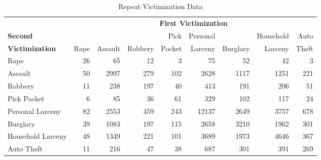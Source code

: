 \begin{table}[htb]
 \caption{Repeat Victimization Data}
 \label{tab:victims}
 \begin{center}
  \begin{tabular}{|l|rrrrrrrr|}
   \hline
 & \multicolumn{8}{c|}{\bfseries\large First Victimization }\rule{0in}{2.5ex}\\
{\bfseries\large Second       } &          &       &       & Pick     & Personal &      & Household & Auto    \\
{\bfseries\large Victimization} & Rape     & Assault & Robbery & Pocket & Larceny & Burglary & Larceny & Theft   \\
   \hline
Rape                   &            26 &            65 &            12 &             3 &            75 &            52 &            42 &             3 \\
Assault                &            50 &          2997 &           279 &           102 &          2628 &          1117 &          1251 &           221 \\
Robbery                &            11 &           238 &           197 &            40 &           413 &           191 &           206 &            51 \\
Pick Pocket            &             6 &            85 &            36 &            61 &           329 &           102 &           117 &            24 \\
Personal Larceny           &            82 &          2553 &           459 &           243 &         12137 &          2649 &          3757 &           678 \\
Burglary               &            39 &          1083 &           197 &           115 &          2658 &          3210 &          1962 &           301 \\
Household Larceny           &            48 &          1349 &           221 &           101 &          3689 &          1973 &          4646 &           367 \\
Auto Theft             &            11 &           216 &            47 &            38 &           687 &           301 &           391 &           269 \\
   \hline
  \end{tabular}
 \end{center}
\end{table}
